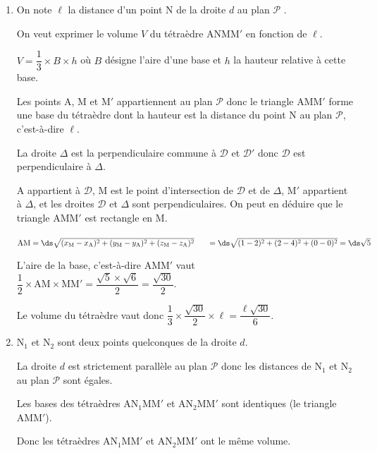 \begin{enumerate}[resume]
\begin{enumerate}
On a donc $2\times (5t) -(2+5t) -5(1+t)=0$ soit $10t -2-5t-5-5t=0$ ou  $0t=7$.

Le système n'a pas de solution donc la droite $d$ est strictement parallèle à $\mathcal{P}$.
		
		\item On note $\ell$ la distance d'un point N de la droite $d$ au plan $\mathcal{P}$ . 
		
On veut exprimer le volume $V$ du  tétraèdre ANMM$'$ en fonction de $\ell$.

$V = \dfrac13 \times B \times h$ où $B$ désigne l'aire d'une base et $h$ la hauteur relative à cette base.

Les points A, M et M$'$ appartiennent au plan $\mathcal{P}$ donc le triangle AMM$'$ forme une base du tétraèdre dont la hauteur est la distance du point N au plan $\mathcal{P}$, c'est-à-dire $\ell$.

La droite $\Delta$ est la perpendiculaire commune à $\mathcal{D}$ et $\mathcal{D}'$ donc $\mathcal{D}$ est perpendiculaire à $\Delta$.

A appartient à $\mathcal{D}$, M est le point d'intersection de $\mathcal{D}$ et de $\Delta$, M$'$ appartient à $\Delta$, et les droites $\mathcal{D}$ et $\Delta$ sont perpendiculaires. On peut en déduire que le triangle AMM$'$ est rectangle en M.

$\text{AM} = \ds\sqrt{(x_{\text{M}} - x_{\text{A}})^2+(y_{\text{M}} - y_{\text{A}})^2+ (z_{\text{M}} - z_{\text{A}})^2}\\
\phantom{\text{AM}}
= \ds\sqrt{(1-2)^2 + (2-4)^2 + (0-0)^2} = \ds\sqrt{5}$

L'aire de la base, c'est-à-dire AMM$'$ vaut $\dfrac{1}{2}\times\text{AM}\times \text{MM}' = \dfrac{\sqrt{5}\times \sqrt{6}}{2}=\dfrac{\sqrt{30}}{2}$.

Le volume du tétraèdre vaut donc $\dfrac{1}{3}\times \dfrac{\sqrt{30}}{2}\times \ell = \dfrac{\ell\sqrt{30}}{6}$.

		\item N$_1$ et N$_2$ sont deux points quelconques de la droite $d$.%
		
La droite $d$ est strictement parallèle au plan $\mathcal{P}$ donc les distances de N$_1$ et N$_2$ au plan $\mathcal{P}$ sont égales.

Les bases des  tétraèdres AN$_1$MM$'$ et AN$_2$MM$'$ sont identiques (le triangle AMM$'$).

Donc les tétraèdres AN$_1$MM$'$ et AN$_2$MM$'$ ont le même volume.
		
	\end{enumerate}
\end{enumerate}
